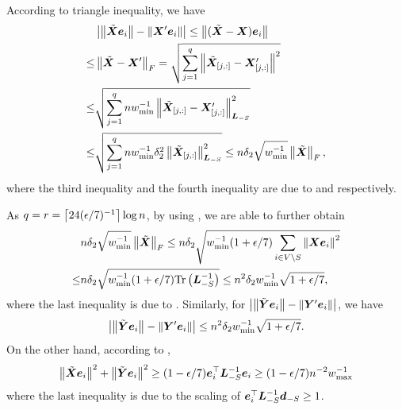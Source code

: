 \documentclass[10pt,twocolumn,twoside]{IEEEtran}
\begin{document}
\begin{IEEEproof}
    According to triangle inequality, we have
    \begin{align*}
            & \left|\left\Vert\tilde{\boldsymbol{X}}\boldsymbol{e}_i\right\Vert-\left\Vert\boldsymbol{X}'\boldsymbol{e}_i\right\Vert \right|\le\left\Vert(\tilde{\boldsymbol{X}}-\boldsymbol{X})\boldsymbol{e}_i\right\Vert                                                   \\
        \le & \left\Vert\tilde{\boldsymbol{X}}-\boldsymbol{X}'\right\Vert_{F}= \sqrt{\sum_{j=1}^q\left\Vert\tilde{\boldsymbol{X}}_{[j,:]}-\boldsymbol{X}'_{[j,:]}\right\Vert^2}                                             \\
        \le & \sqrt{\sum_{j=1}^qnw_{\min}^{-1}\left\Vert\tilde{\boldsymbol{X}}_{[j,:]}-\boldsymbol{X}'_{[j,:]}\right\Vert_{\boldsymbol{L}_{-S}}^2}                                                   \\
        \le & \sqrt{\sum_{j=1}^qnw_{\min}^{-1}\delta_2^2\left\Vert\tilde{\boldsymbol{X}}_{[j,:]}\right\Vert_{\boldsymbol{L}_{-S}}^2}\le n\delta_2\sqrt{w_{\min}^{-1}}\left\Vert\tilde{\boldsymbol{X}}\right\Vert_F,
    \end{align*}
    where the third inequality and the fourth inequality are due to  and  respectively.

    As \(q=r=\left\lceil24(\epsilon/7)^{-1}\right\rceil\log n\), by using , we are able to further obtain
    \begin{align*}
            & n\delta_2\sqrt{w_{\min}^{-1}}\left\Vert\tilde{\boldsymbol{X}}\right\Vert_F\le n\delta_2\sqrt{w_{\min}^{-1}(1+\epsilon/7)\sum_{i\in V\setminus S}\left\Vert\boldsymbol{X}\boldsymbol{e}_i\right\Vert^2} \\
        \le & n\delta_2\sqrt{w_{\min}^{-1}(1+\epsilon/7)\mathrm{Tr}\left(\boldsymbol{L}_{-S}^{-1}\right)}\le n^2\delta_2w_{\min}^{-1}\sqrt{1+\epsilon/7},
    \end{align*}
    where the last inequality is due to .
    Similarly, for \(\left|\left\Vert\tilde{\boldsymbol{Y}}\boldsymbol{e}_i\right\Vert-\left\Vert\boldsymbol{Y}'\boldsymbol{e}_i\right\Vert \right|\), we have
    \begin{equation}\label{eq:approx-maty-raw}
        \left|\left\Vert\tilde{\boldsymbol{Y}}\boldsymbol{e}_i\right\Vert-\left\Vert\boldsymbol{Y}'\boldsymbol{e}_i\right\Vert \right|\le n^2\delta_2w_{\min}^{-1}\sqrt{1+\epsilon/7}.
    \end{equation}
    On the other hand, according to ,
    \[\left\Vert\tilde{\boldsymbol{X}}\boldsymbol{e}_i\right\Vert^2+\left\Vert\tilde{\boldsymbol{Y}}\boldsymbol{e}_i\right\Vert^2\ge(1-\epsilon/7)\boldsymbol{e}_i^\top\boldsymbol{L}_{-S}^{-1}\boldsymbol{e}_i\ge(1-\epsilon/7)n^{-2}w_{\max}^{-1}\]
    where the last inequality is due to the scaling of \(\boldsymbol{e}_i^\top\boldsymbol{L}_{-S}^{-1}\boldsymbol{d}_{-S}\ge1\).


\end{IEEEproof}
\end{document}

